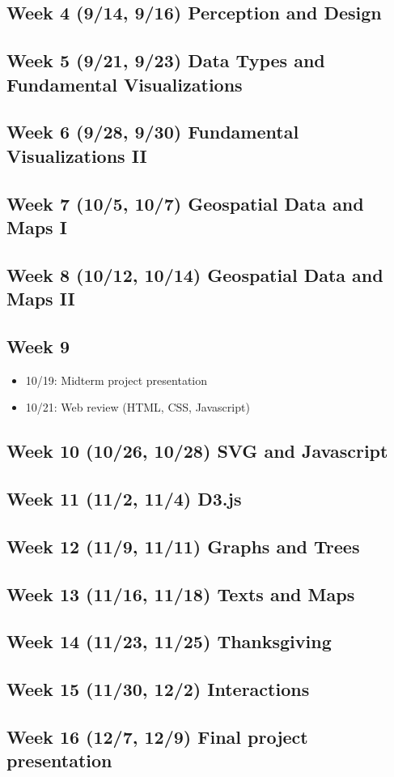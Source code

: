 \documentclass[11pt,article,oneside]{memoir}
\begin{document}
\subsection{Week 4 (9/14, 9/16) Perception and Design}
\subsection{Week 5 (9/21, 9/23) Data Types and Fundamental Visualizations}
\subsection{Week 6 (9/28, 9/30) Fundamental Visualizations II }
\subsection{Week 7 (10/5, 10/7) Geospatial Data and Maps I}
\subsection{Week 8 (10/12, 10/14) Geospatial Data and Maps II}

\subsection{Week 9}
\vspace{-5pt}
\begin{itemize}
\itemsep=-5pt
\item 10/19: Midterm project presentation
\item 10/21: Web review (HTML, CSS, Javascript)
\end{itemize}

\subsection{Week 10 (10/26, 10/28) SVG and Javascript }
\subsection{Week 11 (11/2, 11/4) D3.js}
\subsection{Week 12 (11/9, 11/11) Graphs and Trees}
\subsection{Week 13 (11/16, 11/18) Texts and Maps}
\subsection{Week 14 (11/23, 11/25) Thanksgiving}
\subsection{Week 15 (11/30, 12/2) Interactions}
\subsection{Week 16 (12/7, 12/9) Final project presentation}
\end{document}
